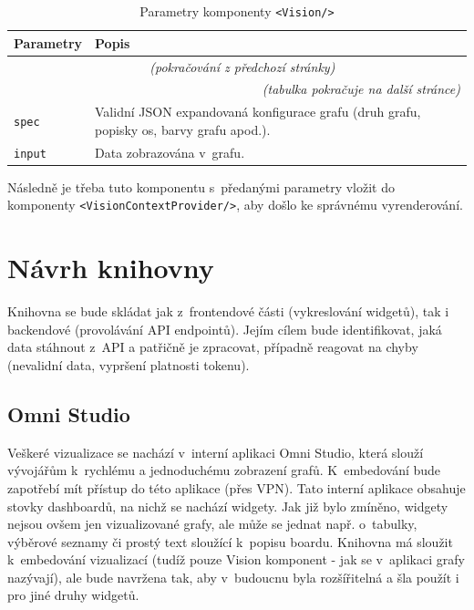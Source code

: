 \documentclass[czech, bc, kiv, he, iso690numb]{fasthesis}
\begin{document}
	\begin{longtable}{p{}p{}}
	\caption{Parametry komponenty \texttt{<Vision/>}}
	\label{tab:visionParams}\\
	\toprule[1.5pt]
	\textbf{Parametry} & \textbf{Popis}\\
	\midrule
	\endfirsthead
	\multicolumn{2}{c}{\tablename{}~\thetable{} \textit{(pokračování z předchozí stránky)}}\\
	\endhead
	\midrule
	\multicolumn{2}{r}{\textit{(tabulka pokračuje na další stránce)}}\\
	\endfoot
	\bottomrule[1.5pt]
	\endlastfoot
	\verb"spec" & Validní JSON expandovaná konfigurace grafu (druh grafu, popisky os, barvy grafu apod.). \\
	\midrule
	\verb"input" &  Data zobrazována v~grafu. \\
	\end{longtable}

Následně je třeba tuto komponentu s~předanými parametry vložit do komponenty \texttt{<VisionContextProvider/>}, aby došlo ke správnému vyrenderování.

\section{Návrh knihovny}

Knihovna se bude skládat jak z~frontendové části (vykreslování widgetů), tak i backendové (provolávání API endpointů). Jejím cílem bude identifikovat, jaká data stáhnout z~API a patřičně je zpracovat, případně reagovat na chyby (nevalidní data, vypršení platnosti tokenu).
\subsection{Omni Studio}
Veškeré vizualizace se nachází v~interní aplikaci Omni Studio, která slouží vývojářům k~rychlému a jednoduchému zobrazení grafů. K~embedování bude zapotřebí mít přístup do této aplikace (přes VPN). Tato interní aplikace
obsahuje stovky dashboardů, na nichž se nachází widgety. Jak již bylo zmíněno, widgety nejsou ovšem jen vizualizované grafy, ale může se jednat např. o~tabulky, výběrové seznamy či prostý text sloužící k~popisu boardu.
Knihovna má sloužit k~embedování vizualizací (tudíž pouze Vision komponent - jak se v~aplikaci grafy nazývají), ale bude navržena tak, aby v~budoucnu byla rozšířitelná a šla použít i pro jiné druhy widgetů.
\end{document}
